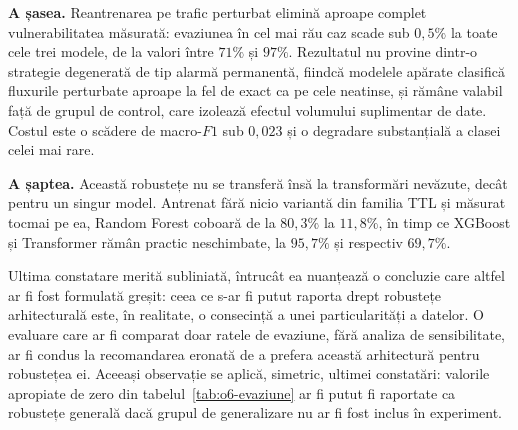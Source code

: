 \textbf{A șasea.} Reantrenarea pe trafic perturbat elimină aproape complet vulnerabilitatea măsurată: evaziunea în cel mai rău caz scade sub $0{,}5\%$ la toate cele trei modele, de la valori între $71\%$ și $97\%$. Rezultatul nu provine dintr-o strategie degenerată de tip alarmă permanentă, fiindcă modelele apărate clasifică fluxurile perturbate aproape la fel de exact ca pe cele neatinse, și rămâne valabil față de grupul de control, care izolează efectul volumului suplimentar de date. Costul este o scădere de macro-$F1$ sub $0{,}023$ și o degradare substanțială a clasei celei mai rare.

\textbf{A șaptea.} Această robustețe nu se transferă însă la transformări nevăzute, decât pentru un singur model. Antrenat fără nicio variantă din familia TTL și măsurat tocmai pe ea, Random Forest coboară de la $80{,}3\%$ la $11{,}8\%$, în timp ce XGBoost și Transformer rămân practic neschimbate, la $95{,}7\%$ și respectiv $69{,}7\%$.

Ultima constatare merită subliniată, întrucât ea nuanțează o concluzie care altfel ar fi fost formulată greșit: ceea ce s-ar fi putut raporta drept robustețe arhitecturală este, în realitate, o consecință a unei particularități a datelor. O evaluare care ar fi comparat doar ratele de evaziune, fără analiza de sensibilitate, ar fi condus la recomandarea eronată de a prefera această arhitectură pentru robustețea ei. Aceeași observație se aplică, simetric, ultimei constatări: valorile apropiate de zero din tabelul~\ref{tab:o6-evaziune} ar fi putut fi raportate ca robustețe generală dacă grupul de generalizare nu ar fi fost inclus în experiment.
